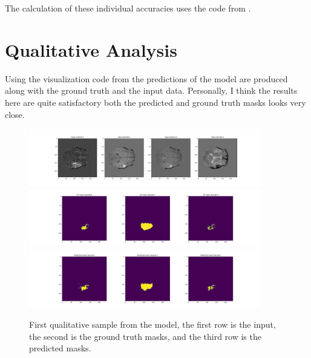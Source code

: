 \documentclass[onecolumn]{article}
\begin{document}
\newpage

The calculation of these individual accuracies uses the code from \cite{training}. 

\section{Qualitative Analysis}

Using the visualization code from \cite{monaitutorial} the predictions of the model are produced along with the ground truth and the input data. Personally, I think the results here are quite satisfactory both the predicted and ground truth masks looks very close.

\begin{figure}[!ht]
	\centering
	\includegraphics[width=0.9\textwidth]{imgs/inputs1.png}
	\includegraphics[width=0.9\textwidth]{imgs/gt1.png}
	\includegraphics[width=0.9\textwidth]{imgs/pred1.png}
	\caption{First qualitative sample from the model, the first row is the input, the second is the ground truth masks, and the third row is the predicted masks.}
	\label{fig:res2}
\end{figure}
\end{document}
